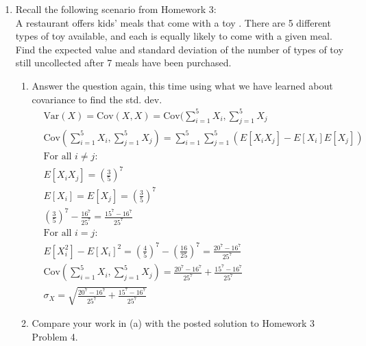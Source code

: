\documentclass{article}
\begin{document}
\begin{enumerate}
\begin{enumerate}
\begin{align*}
                    &\text{Var}(X) = n\cdot\frac{5}{36} \Rightarrow \sigma_X = \frac{\sqrt{5n}}{6} \\
                    &\rho(X,Y) = \frac{\text{Cov}(X,Y)}{\sigma_X\cdot\sigma_Y}=-\frac{n}{36}\cdot\frac{36}{5n}=-\frac{1}{5}
                \end{align*}
                I would have assumed beforehand that it would have been something not so clean.
        \end{enumerate}
    \clearpage
    \item   Recall the following scenario from Homework 3: \\
            A restaurant offers kids' meals that come with a toy . There are 5 different types of toy available, 
            and each is equally likely to come with a given meal. Find the expected value and standard deviation of 
            the number of types of toy still uncollected after 7 meals have been purchased.
        \begin{enumerate}
            \item   Answer the question again, this time using what we have learned about covariance to find the 
                    std. dev.
                \begin{align*}
                    &\text{Var}(X) = \text{Cov}(X,X) = \text{Cov}(\sum^{5}_{i=1}X_i,\sum_{j=1}^{5}X_j\\
                    &\text{Cov}(\sum^{5}_{i=1}X_i,\sum_{j=1}^{5}X_j)=\sum^{5}_{i=1}\sum_{j=1}^{5}\left(E[X_iX_j]-E[X_i]E[X_j]\right)\\
                    &\text{For all $i\neq j$:}\\
                    &E[X_iX_j]=\left(\frac{3}{5}\right)^7 \\
                    &E[X_i]=E[X_j]=\left(\frac{3}{5}\right)^7\\
                    &\left(\frac{3}{5}\right)^7-\frac{16^7}{25^7}=\frac{15^7-16^7}{25^7}\\
                    &\text{For all $i=j$:}\\
                    &E[X_i^2]-E[X_i]^2 = \left(\frac{4}{5}\right)^7-\left(\frac{16}{25}\right)^7 = \frac{20^7-16^7}{25^7}\\
                    &\text{Cov}(\sum^{5}_{i=1}X_i,\sum_{j=1}^{5}X_j)=\frac{20^7-16^7}{25^7}+\frac{15^7-16^7}{25^7}\\
                    &\sigma_X=\sqrt{\frac{20^7-16^7}{25^7}+\frac{15^7-16^7}{25^7}}
                \end{align*}
            \item   Compare your work in (a) with the posted solution to Homework 3 Problem 4.

\end{enumerate}
\end{enumerate}
\end{document}
